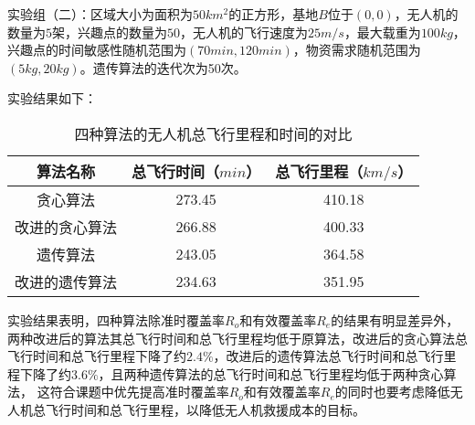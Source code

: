 实验组（二）：区域大小为面积为$50km^2$的正方形，基地$B$位于$(0,0)$，无人机的数量为$5$架，兴趣点的数量为$50$，无人机的飞行速度为$25m/s$，最大载重为$100kg$，兴趣点的时间敏感性随机范围为$(70min,120min)$，物资需求随机范围为$(5kg,20kg)$。遗传算法的迭代次为50次。


实验结果如下：
\begin{table}[H]
    \begin{center}
        \begin{tabular}{|c|c|c|}
            \hline
            算法名称 & 总飞行时间（$min$） & 总飞行里程（$km/s$） \\
            \hline
            贪心算法 & 273.45 & 410.18 \\
            \hline
            改进的贪心算法 & 266.88 & 400.33 \\
            \hline
            遗传算法 & 243.05 & 364.58 \\
            \hline
            改进的遗传算法 & 234.63 & 351.95 \\
            \hline
        \end{tabular}
        \caption{四种算法的无人机总飞行里程和时间的对比}
    \end{center}
\end{table}


实验结果表明，四种算法除准时覆盖率$R_o$和有效覆盖率$R_e$的结果有明显差异外，两种改进后的算法其总飞行时间和总飞行里程均低于原算法，改进后的贪心算法总飞行时间和总飞行里程下降了约$2.4\%$，改进后的遗传算法总飞行时间和总飞行里程下降了约$3.6\%$，且两种遗传算法的总飞行时间和总飞行里程均低于两种贪心算法，
这符合课题中优先提高准时覆盖率$R_o$和有效覆盖率$R_e$的同时也要考虑降低无人机总飞行时间和总飞行里程，以降低无人机救援成本的目标。

